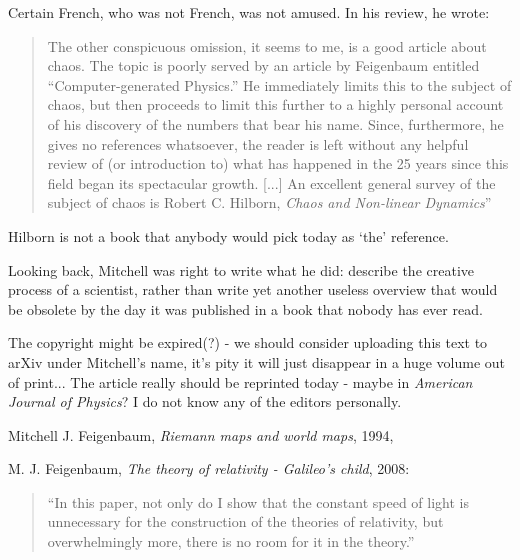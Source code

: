 \begin{description}
Certain French, who was not French,
was not amused. In his review, he wrote:
\begin{quote}
  The other conspicuous omission, it seems to me, is a good
article about chaos. The topic is poorly served by an article
by Feigenbaum entitled ``Computer-generated Physics.'' He
immediately limits this to the subject of chaos, but then proceeds
to limit this further to a highly personal account of his
discovery of the numbers that bear his name. Since, furthermore,
he gives no references whatsoever, the reader is left
without any helpful review of (or introduction to) what has
happened in the 25 years since this field began its spectacular
growth.
[...]
An excellent general survey of the subject of chaos is Robert C.
Hilborn, {\em Chaos and Non-linear Dynamics}''
\end{quote}

Hilborn is not a book that anybody would pick today as `the' reference.

Looking back, Mitchell was right to write what he did: describe the
creative process of a scientist, rather than write yet another useless
overview that would be obsolete by the day it was published in a book
that nobody has ever read.

The copyright might be expired(?) - we should consider uploading this
text to arXiv under Mitchell's name, it's pity it will just disappear in
a huge volume out of print...
The article really should be reprinted today -
maybe in {\em American Journal of Physics}? I do not know any of the
{editors} personally.
\end{description}

{Mitchell J. Feigenbaum},
{\em Riemann maps and world maps},
{1994},

{M. J. Feigenbaum},
{\em The theory of relativity - {Galileo's} child},
{2008}:
\begin{quote}
``In this paper, not only do I show that the constant speed of light is
unnecessary for the construction of the theories of relativity, but
overwhelmingly more, there is no room for it in the theory.''
\end{quote}

